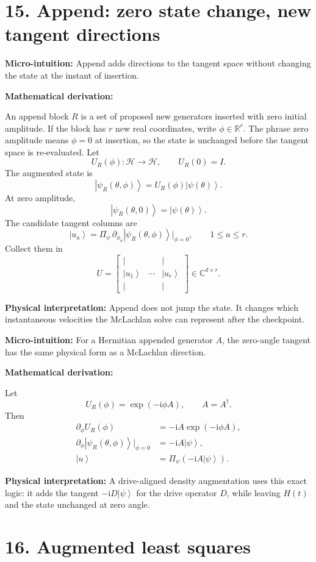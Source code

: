 \documentclass[10pt,twocolumn]{article}
\newcommand{\ii}{\mathrm{i}}
\newcommand{\ket}[1]{\left|#1\right\rangle}
\newcommand{\R}{\mathbb R}
\newcommand{\C}{\mathbb C}
\newcommand{\Hh}{\mathcal H}
\newcommand{\Id}{I}
\newcommand{\micro}[1]{%
  \par\smallskip
  \noindent\textcolor{deepblue}{\textbf{Micro-intuition:}} #1
  \par\smallskip}
\newcommand{\deriv}{%
  \par\noindent\textcolor{deepviolet}{\textbf{Mathematical derivation:}}\par\vspace{-1mm}}
\newcommand{\phys}[1]{%
  \par\smallskip
  \noindent\textcolor{deepgreen}{\textbf{Physical interpretation:}} #1
  \par\smallskip}
\begin{document}
\section*{15. Append: zero state change, new tangent directions}

\micro{Append adds directions to the tangent space without changing the state at
the instant of insertion.}

\deriv
An append block \(R\) is a set of proposed new generators inserted with zero
initial amplitude. If the block has \(r\) new real coordinates, write
\(\phi\in\R^r\). The phrase zero amplitude means \(\phi=0\) at insertion, so
the state is unchanged before the tangent space is re-evaluated. Let
\[
U_R(\phi):\Hh\to\Hh,\qquad U_R(0)=\Id.
\]
The augmented state is
\[
\ket{\psi_R(\theta,\phi)}=U_R(\phi)\ket{\psi(\theta)}.
\]
At zero amplitude,
\[
\ket{\psi_R(\theta,0)}=\ket{\psi(\theta)}.
\]
The candidate tangent columns are
\[
\ket{u_a}=\Pi_\psi\,\partial_{\phi_a}\ket{\psi_R(\theta,\phi)}\big|_{\phi=0},
\qquad
1\le a\le r.
\]
Collect them in
\[
U=
\begin{bmatrix}
| & & |\\
\ket{u_1}&\cdots&\ket{u_r}\\
| & & |
\end{bmatrix}
\in\C^{d\times r}.
\]

\phys{Append does not jump the state. It changes which instantaneous velocities
the McLachlan solve can represent after the checkpoint.}

\micro{For a Hermitian appended generator \(A\), the zero-angle tangent has the
same physical form as a McLachlan direction.}

\deriv
Let
\[
U_R(\phi)=\exp(-\ii\phi A),
\qquad A=A^\dagger.
\]
Then
\[
\begin{aligned}
\partial_\phi U_R(\phi)
&=-\ii A\exp(-\ii\phi A),\\
\partial_\phi\ket{\psi_R(\theta,\phi)}\big|_{\phi=0}
&=-\ii A\ket{\psi},\\
\ket u&=\Pi_\psi(-\ii A\ket{\psi}).
\end{aligned}
\]

\phys{A drive-aligned density augmentation uses this exact logic: it adds the
tangent \(-\ii D\ket\psi\) for the drive operator \(D\), while leaving \(H(t)\) and
the state unchanged at zero angle.}

\section*{16. Augmented least squares}
\end{document}
